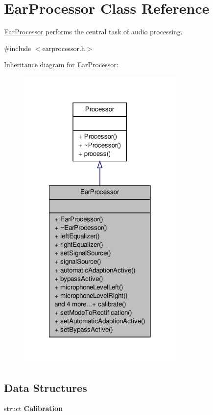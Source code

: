 \hypertarget{classEarProcessor}{\section{\-Ear\-Processor \-Class \-Reference}
\label{d2/dd5/classEarProcessor}
}


\hyperlink{classEarProcessor}{\-Ear\-Processor} performs the central task of audio processing.  




{\ttfamily \#include $<$earprocessor.\-h$>$}



\-Inheritance diagram for \-Ear\-Processor\-:
\nopagebreak
\begin{figure}[H]
\begin{center}
\leavevmode
\includegraphics[width=234pt]{d0/df8/classEarProcessor__inherit__graph}
\end{center}
\end{figure}
\subsection*{\-Data \-Structures}
\begin{DoxyCompactItemize}
\item 
struct {\bfseries \-Calibration}
\end{DoxyCompactItemize}
